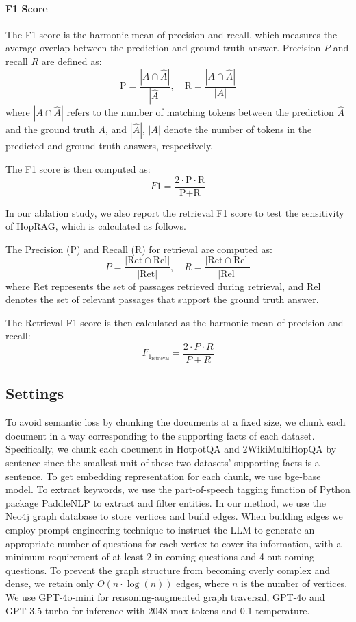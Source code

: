      \paragraph{F1 Score}
    The F1 score is the harmonic mean of precision and recall, which measures the average overlap between the prediction and ground truth answer. Precision \( P \) and recall \( R \) are defined as:
    \[
    \text{P} = \frac{| A \cap \hat{A} |}{| \hat{A} |}, \quad \text{R} = \frac{| A \cap \hat{A} |}{| A |}
    \]
    where \( | A \cap \hat{A} | \) refers to the number of matching tokens between the prediction \( \hat{A} \) and the ground truth \( A \), and \( |\hat{A}| \), \( |A| \) denote the number of tokens in the predicted and ground truth answers, respectively.

    The F1 score is then computed as:
    \[
    F1 = \frac{2 \cdot \text{P} \cdot \text{R}}{\text{P} + \text{R}}
    \]

In our ablation study, we also report the retrieval F1 score to test the sensitivity of HopRAG, which is calculated as follows.

The Precision (P) and Recall (R) for retrieval are computed as:
\[
P = \frac{| \text{Ret} \cap \text{Rel} |}{| \text{Ret} |}, \quad R = \frac{| \text{Ret} \cap \text{Rel} |}{| \text{Rel} |}
\]
where \( \text{Ret} \) represents the set of passages retrieved during retrieval, and \( \text{Rel} \) denotes the set of relevant passages that support the ground truth answer.

The Retrieval F1 score is then calculated as the harmonic mean of precision and recall:
\[
F_{1_{\text{retrieval}}} = \frac{2 \cdot P \cdot R}{P + R}
\]
\subsection{Settings}  
\label{setup}
To avoid semantic loss by chunking the documents at a fixed size, we chunk each document in a way corresponding to the supporting facts of each dataset. Specifically, we chunk each document in HotpotQA and 2WikiMultiHopQA by sentence since the smallest unit of these two datasets' supporting facts is a sentence.
To get embedding representation for each chunk, we use bge-base model. To extract keywords, we use the part-of-speech tagging function of Python package PaddleNLP to extract and filter entities.
In our method, we use the Neo4j graph database to store vertices and build edges. When building edges we employ prompt engineering technique to instruct the LLM to generate an appropriate number of questions for each vertex to cover its information, with a minimum requirement of at least 2 in-coming questions and 4 out-coming questions. To prevent the graph structure from becoming overly complex and dense, we retain only $O(n\cdot\log(n))$ edges, where $n$ is the number of vertices. We use GPT-4o-mini for reasoning-augmented graph traversal, GPT-4o and GPT-3.5-turbo for inference with 2048 max tokens and 0.1 temperature. 
